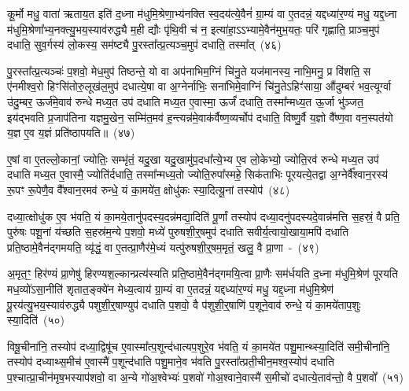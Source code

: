 कू॒र्मो मधु॒ वाता॑ ऋताय॒त इति॑ द॒ध्ना म॑धुमि॒श्रेणा॒भ्य॑नक्ति स्व॒दय॑त्ये॒वैनं॑ ग्रा॒म्यं वा ए॒तदन्नं॒ यद्दध्या॑र॒ण्यं मधु॒ यद्द॒ध्ना म॑धुमि॒श्रेणा᳚भ्य॒नक्त्यु॒भय॒स्याव॑रुद्ध्यै म॒ही द्यौः पृ॑थि॒वी च॑ न॒ इत्या॑हा॒ऽऽभ्यामे॒वैन॑मुभ॒यतः॒ परि॑ गृह्णाति॒ प्राञ्च॒मुप॑ दधाति॒ सुव॒र्गस्य॑ लो॒कस्य॒ सम॑ष्ट्यै पु॒रस्ता᳚त्प्र॒त्यञ्च॒मुप॑ दधाति॒ तस्मा᳚त्~(४६)\ip

पु॒रस्ता᳚त्प्र॒त्यञ्चः॑ प॒शवो॒ मेध॒मुप॑ तिष्ठन्ते॒ यो वा अप॑नाभिम॒ग्निं चि॑नु॒ते यज॑मानस्य॒ नाभि॒मनु॒ प्र वि॑शति॒ स ए॑नमीश्व॒रो हिꣳसि॑तोरु॒लूख॑ल॒मुप॑ दधात्ये॒षा वा अ॒ग्नेर्नाभिः॒ सना॑भिमे॒वाग्निं चि॑नु॒ते\-ऽहिꣳ॑साया॒ औ॑दुम्बरं भव॒त्यूर्ग्वा उ॑दु॒म्बर॒ ऊर्ज॑मे॒वाव॑ रुन्धे मध्य॒त उप॑ दधाति मध्य॒त ए॒वास्मा॒ ऊर्जं॑ दधाति॒ तस्मा᳚न्मध्य॒त ऊ॒र्जा भु॑ञ्जत॒ इय॑द्भवति प्र॒जा\-प॑तिना यज्ञमु॒खेन॒ सम्मि॑त॒मव॑ ह॒न्त्यन्न॑मे॒वाक॑र्वैष्ण॒व्यर्चोप॑ दधाति॒ विष्णु॒र्वै य॒ज्ञो वै᳚ष्ण॒वा वन॒स्पत॑यो य॒ज्ञ ए॒व य॒ज्ञं प्रति॑\-ष्ठापयति॥~(४७)\ip

{\anuvakamend[{ए॒ष वै प॒शुर्यम॑सर्पदे॒ष यत्तस्मा॒त्तस्मा᳚थ्स॒प्तविꣳ॑शतिश्च}]}

ए॒षां वा ए॒तल्लो॒कानां॒ ज्योतिः॒ सम्भृ॑तं॒ यदु॒खा यदु॒खामु॑प॒दधा᳚त्ये॒भ्य ए॒व लो॒केभ्यो॒ ज्योति॒रव॑ रुन्धे मध्य॒त उप॑ दधाति मध्य॒त ए॒वास्मै॒ ज्योति॑र्दधाति॒ तस्मा᳚न्मध्य॒तो ज्योति॒रुपा᳚स्महे॒ सिक॑ताभिः पूरयत्ये॒तद्वा अ॒ग्नेर्वै᳚श्वान॒रस्य॑ रू॒पꣳ रू॒पेणै॒व वै᳚श्वान॒रमव॑ रुन्धे॒ यं का॒मये॑त॒ क्षोधु॑कः स्या॒दित्यू॒नां तस्योप॑~(४८)\ip

दध्या॒त्क्षोधु॑क ए॒व भ॑वति॒ यं का॒मये॒तानु॑पदस्य॒दन्न॑मद्या॒दिति॑ पू॒र्णां तस्योप॑ दध्या॒दनु॑पदस्यदे॒वान्न॑मत्ति स॒हस्रं॒ वै प्रति॒ पुरु॑षः पशू॒नां य॑च्छति स॒हस्र॑म॒न्ये प॒शवो॒ मध्ये॑ पुरुषशी॒र्॒\mbox{}षमुप॑ दधाति सवीर्य॒त्वायो॒खाया॒मपि॑ दधाति प्रति॒ष्ठामे॒वैन॑द्गमयति॒ व्यृ॑द्धं॒ वा ए॒तत्प्रा॒णैर॑मे॒ध्यं यत्पु॑रुषशी॒र्॒\mbox{}षम॒मृतं॒ खलु॒ वै प्रा॒णा~-~(४९)\ip

अ॒मृत॒ꣳ॒ हिर॑ण्यं प्रा॒णेषु॑ हिरण्यश॒ल्कान्प्रत्य॑स्यति प्रति॒ष्ठामे॒वैन॑द्गमयि॒त्वा प्रा॒णैः सम॑र्धयति द॒ध्ना म॑धुमि॒श्रेण॑ पूरयति मध॒व्यो॑\-ऽसा॒नीति॑ शृतात॒ङ्क्ये॑न मेध्य॒त्वाय॑ ग्रा॒म्यं वा ए॒तदन्नं॒ यद्दध्या॑र॒ण्यं मधु॒ यद्द॒ध्ना म॑धुमि॒श्रेण॑ पू॒रय॑त्यु॒भय॒स्याव॑रुद्ध्यै पशुशी॒र्॒\mbox{}षाण्युप॑ दधाति प॒शवो॒ वै प॑शुशी॒र्॒\mbox{}षाणि॑ प॒शूने॒वाव॑ रुन्धे॒ यं का॒मये॑ताप॒शुः स्या॒दिति॑~(५०)\ip

विषू॒चीना॑नि॒ तस्योप॑ दध्या॒द्विषू॑च ए॒वास्मा᳚त्प॒शून्द॑धात्यप॒शुरे॒व भ॑वति॒ यं का॒मये॑त पशु॒मान्थ्स्या॒दिति॑ समी॒चीना॑नि॒ तस्योप॑ दध्याथ्स॒मीच॑ ए॒वास्मै॑ प॒शून्द॑धाति पशु॒माने॒व भ॑वति पु॒रस्ता᳚त्प्रती॒चीन॒मश्व॒स्योप॑ दधाति प॒श्चात्प्रा॒चीन॑मृष॒भस्याप॑शवो॒ वा अ॒न्ये गो॑अ॒श्वेभ्यः॑ प॒शवो॑ गोअ॒श्वाने॒वास्मै॑ स॒मीचो॑ दधात्ये॒ताव॑न्तो॒ वै प॒शवो᳚~(५१)\ip

